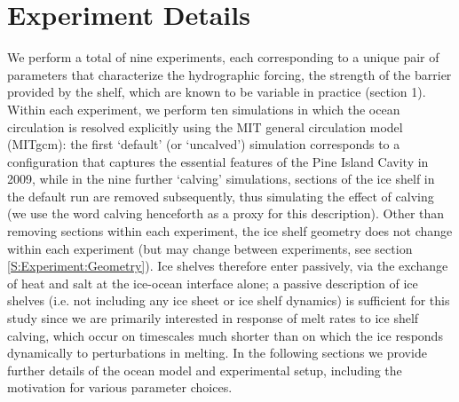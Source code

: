 \documentclass[draft]{agujournal2019}
\begin{document}
\section{Experiment Details}
We perform a total of nine experiments, each corresponding to a unique pair of parameters that characterize the hydrographic forcing, the strength of the barrier provided by the shelf, which are known to be variable in practice (section 1). Within each experiment, we perform ten simulations in which the ocean circulation is resolved explicitly using the MIT general circulation model (MITgcm): the first `default' (or `uncalved') simulation  corresponds to a configuration that captures the essential features of the Pine Island Cavity in 2009, while in the nine further `calving' simulations, sections of the ice shelf in the default run are removed subsequently, thus simulating the effect of calving (we use the word calving henceforth as a proxy for this description). Other than removing sections within each experiment, the ice shelf geometry does not change within each experiment (but may change between experiments, see section \ref{S:Experiment:Geometry}). Ice shelves therefore enter passively, via the exchange of heat and salt at the ice-ocean interface alone; a passive description of ice shelves (i.e. not including any ice sheet or ice shelf dynamics) is sufficient for this study since we are primarily interested in response of melt rates to ice shelf calving, which occur on timescales much shorter than on which the ice responds dynamically to perturbations in melting. In the following sections we provide further details of the ocean model and experimental setup, including the motivation for various parameter choices.
\end{document}
